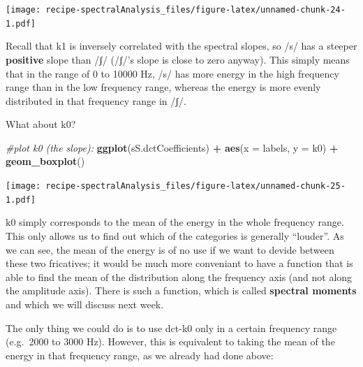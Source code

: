 \documentclass[]{book}
\newenvironment{Shaded}{\begin{snugshade}}{\end{snugshade}}
\newcommand{\CommentTok}[1]{\textcolor[rgb]{0.56,0.35,0.01}{\textit{#1}}}
\newcommand{\DataTypeTok}[1]{\textcolor[rgb]{0.13,0.29,0.53}{#1}}
\newcommand{\KeywordTok}[1]{\textcolor[rgb]{0.13,0.29,0.53}{\textbf{#1}}}
\newcommand{\NormalTok}[1]{#1}
\newcommand{\OperatorTok}[1]{\textcolor[rgb]{0.81,0.36,0.00}{\textbf{#1}}}
\newcommand{\StringTok}[1]{\textcolor[rgb]{0.31,0.60,0.02}{#1}}
\begin{document}
\texttt{[image: recipe-spectralAnalysis\_files/figure-latex/unnamed-chunk-24-1.pdf]}

Recall that k1 is inversely correlated with the spectral slopes, so /s/ has a steeper \textbf{positive} slope than /ʃ/ (/ʃ/'s slope is close to zero anyway).
This simply means that in the range of 0 to 10000 Hz, /s/ has more energy in the high frequency range than in the low frequency range, whereas the energy is more evenly distributed in that frequency range in /ʃ/.

What about k0?

\begin{Shaded}
\begin{Highlighting}[]
\CommentTok{#plot k0 (the slope):}
\KeywordTok{ggplot}\NormalTok{(sS.dctCoefficients) }\OperatorTok{+}
\StringTok{  }\KeywordTok{aes}\NormalTok{(}\DataTypeTok{x =}\NormalTok{ labels, }\DataTypeTok{y =}\NormalTok{ k0) }\OperatorTok{+}
\StringTok{  }\KeywordTok{geom_boxplot}\NormalTok{()}
\end{Highlighting}
\end{Shaded}

\texttt{[image: recipe-spectralAnalysis\_files/figure-latex/unnamed-chunk-25-1.pdf]}

k0 simply corresponds to the mean of the energy in the whole frequency range. This only allows us to find out which of the categories is generally ``louder''. As we can see, the mean of the energy is of no use if we want to devide between these two fricatives; it would be much more conveniant to have a function that is able to find the mean of the distribution along the frequency axis (and not along the amplitude axis). There is such a function, which is called \textbf{spectral moments} and which we will discuss next week.

The only thing we could do is to use dct-k0 only in a certain frequency range (e.g.~2000 to 3000 Hz). However, this is equivalent to taking the mean of the energy in that frequency range, as we already had done above:
\end{document}

